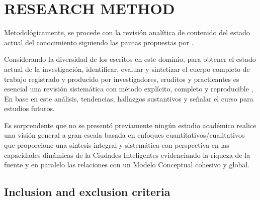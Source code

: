\documentclass[a4paper,fleqn,spanish]{cas-dc}
\begin{document}
\section{RESEARCH METHOD}\label{metodo}

Metodológicamente, se procede con la revisión analítica de contenido del estado
actual del conocimiento \cite{kitchenham_guidelines_2007,
webster_analyzing_2002} siguiendo las pautas propuestas por \cite{Wolfswinkel2017}.


Considerando la diversidad
de los escritos en este dominio,
para obtener el estado
actual de la investigación,
identificar, evaluar y sintetizar
el cuerpo completo de trabajo registrado y producido
por investigadores, eruditos y practicantes
es esencial
una revisión sistemática con método explícito, completo y reproducible
\cite{Okoli2015},
En base en este análisis,
tendencias, hallazgos sustantivos y
señalar el curso para estudios futuros.

Es sorprendente que no se presentó previamente ningún estudio académico
realice una visión general a gran escala basada en enfoques
cuantitativos/cualitativos que proporcione una síntesis integral y sistemática
con perspectiva en las capacidades dinámicas de la Ciudades Inteligentes
evidenciando la riqueza de la fuente y en paralelo las relaciones con un
Modelo Conceptual cohesivo y global.


% 

\subsection{Inclusion and exclusion criteria}\label{criterio}
\end{document}
